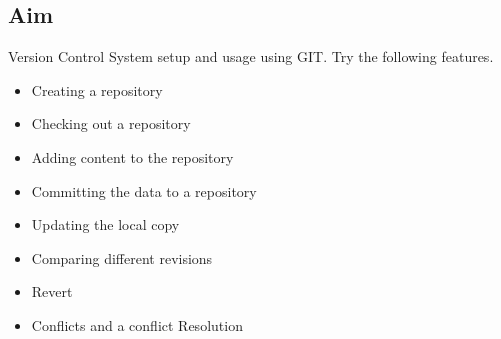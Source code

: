 \documentclass{article}
\begin{document}
\subsection{Aim}
Version Control System setup and usage using GIT. Try the following features.
\begin{itemize}
\item Creating a repository
\item Checking out a repository
\item Adding content to the repository
\item Committing the data to a repository
\item Updating the local copy
\item Comparing different revisions
\item Revert
\item Conflicts and a conflict Resolution
\end{itemize}
\end{document}
